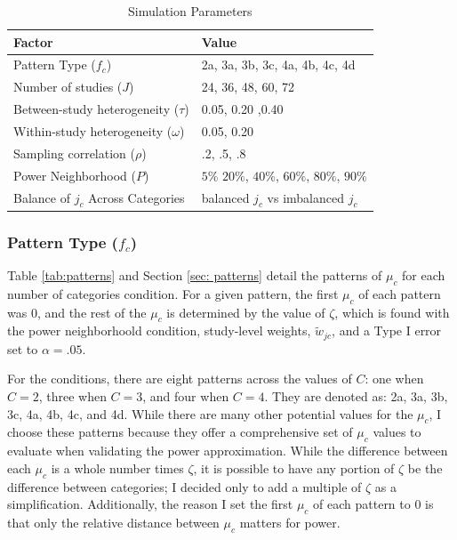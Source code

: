 \begin{table}[H]
\caption{Simulation Parameters}
     \label{tab:experimentalconditions}
    \centering
    \begin{tabular}{p{7cm}p{7cm}}
        \toprule
    Factor & Value \\ \midrule

       Pattern Type ($f_c$)  & 2a, 3a, 3b, 3c, 4a, 4b, 4c, 4d \\
       Number of studies ($J$)  & 24, 36, 48, 60, 72  \\ 
       Between-study heterogeneity ($\tau$)  & 0.05, 0.20 ,0.40 \\
       Within-study heterogeneity ($\omega$) & 0.05, 0.20 \\
       Sampling correlation ($\rho$) & .2, .5, .8 \\
       Power Neighborhood ($P$) & $5\%$ $20\%$, $40\%$, $60\%$, $80\%$, $90\%$ \\
       Balance of $j_c$ Across Categories & balanced $j_c$ vs imbalanced $j_c$ \\
        \bottomrule
    \end{tabular}
   
    \small
    
\end{table}


\subsubsection{Pattern Type ($f_c$)} \label{sec: Pattern Type}


Table \ref{tab:patterns} and Section \ref{sec: patterns} detail the patterns of $\mu_c$ for each number of categories condition. For a given pattern, the first $\mu_c$ of each pattern was 0, and the rest of the $\mu_c$ is determined by the value of $\zeta$, which is found with the power neighborhoold condition, study-level weights, $\tilde{w}_{jc}$, and a Type I error set to $\alpha = .05$. 

For the conditions, there are eight patterns across the values of $C$: one when $C = 2$, three when $C = 3$, and four when $C = 4$. They are denoted as:  2a, 3a, 3b, 3c, 4a, 4b, 4c, and 4d.  While there are many other potential values for the $\mu_c$, I choose these patterns because they offer a comprehensive set of $\mu_c$ values to evaluate when validating the power approximation. While the difference between each $\mu_c$ is a whole number times $\zeta$, it is possible to have any portion of $\zeta$ be the difference between categories; I decided only to add a multiple of $\zeta$ as a simplification. Additionally, the reason I set the first $\mu_c$ of each pattern to $0$ is that only the relative distance between $\mu_c$ matters for power. 

